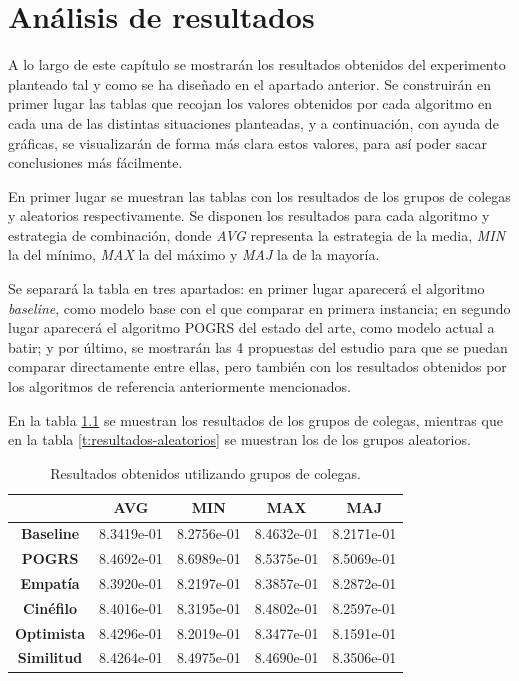 \chapter{Análisis de resultados}

A lo largo de este capítulo se mostrarán los resultados obtenidos del experimento planteado tal y como se ha diseñado en el apartado anterior. Se construirán en primer lugar las tablas que recojan los valores obtenidos por cada algoritmo en cada una de las distintas situaciones planteadas, y a continuación, con ayuda de gráficas, se visualizarán de forma más clara estos valores, para así poder sacar conclusiones más fácilmente.

En primer lugar se muestran las tablas con los resultados de los grupos de colegas y aleatorios respectivamente. Se disponen los resultados para cada algoritmo y estrategia de combinación, donde \textit{AVG} representa la estrategia de la media, \textit{MIN} la del mínimo, \textit{MAX} la del máximo y \textit{MAJ} la de la mayoría.

Se separará la tabla en tres apartados: en primer lugar aparecerá el algoritmo \textit{baseline}, como modelo base con el que comparar en primera instancia; en segundo lugar aparecerá el algoritmo POGRS del estado del arte, como modelo actual a batir; y por último, se mostrarán las 4 propuestas del estudio para que se puedan comparar directamente entre ellas, pero también con los resultados obtenidos por los algoritmos de referencia anteriormente mencionados.

En la tabla \ref{t:resultados-colegas} se muestran los resultados de los grupos de colegas, mientras que en la tabla \ref{t:resultados-aleatorios} se muestran los de los grupos aleatorios.

\begin{table}[H]
	\centering
	\begin{tabular}{ccccc}
		\toprule
		{} & \textbf{AVG} & \textbf{MIN} & \textbf{MAX} & \textbf{MAJ} \\
		\midrule
		\textbf{Baseline} & 8.3419e-01 & 8.2756e-01 & 8.4632e-01 & 8.2171e-01 \\
		\midrule
		\textbf{POGRS} & 8.4692e-01 & 8.6989e-01 & 8.5375e-01 & 8.5069e-01 \\
		\midrule
		\textbf{Empatía} & 8.3920e-01 & 8.2197e-01 & 8.3857e-01 & 8.2872e-01 \\
		\textbf{Cinéfilo} & 8.4016e-01 & 8.3195e-01 & 8.4802e-01 & 8.2597e-01 \\
		\textbf{Optimista} & 8.4296e-01 & 8.2019e-01 & 8.3477e-01 & 8.1591e-01 \\
		\textbf{Similitud} & 8.4264e-01 & 8.4975e-01 & 8.4690e-01 & 8.3506e-01 \\
		\bottomrule
	\end{tabular}
	\caption{Resultados obtenidos utilizando grupos de colegas.}
	\label{t:resultados-colegas}
\end{table}

